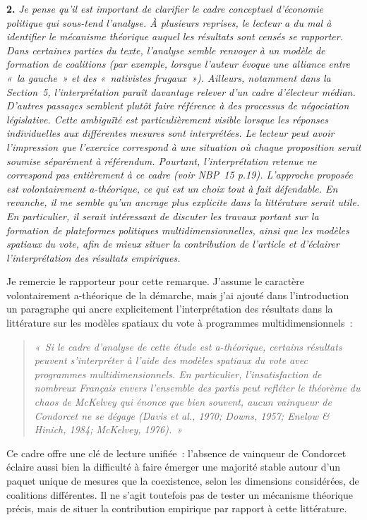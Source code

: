 \documentclass[12pt,french]{article}
\begin{document}
\bigskip
\noindent\textbf{2.} \textit{Je pense qu'il est important de clarifier le cadre conceptuel d'économie politique qui sous-tend l'analyse. À plusieurs reprises, le lecteur a du mal à identifier le mécanisme théorique auquel les résultats sont censés se rapporter. Dans certaines parties du texte, l'analyse semble renvoyer à un modèle de formation de coalitions (par exemple, lorsque l'auteur évoque une alliance entre «~la gauche~» et des «~nativistes frugaux~»). Ailleurs, notamment dans la Section~5, l'interprétation paraît davantage relever d'un cadre d'électeur médian. D'autres passages semblent plutôt faire référence à des processus de négociation législative. Cette ambiguïté est particulièrement visible lorsque les réponses individuelles aux différentes mesures sont interprétées. Le lecteur peut avoir l'impression que l'exercice correspond à une situation où chaque proposition serait soumise séparément à référendum. Pourtant, l'interprétation retenue ne correspond pas entièrement à ce cadre (voir NBP~15 p.19). L'approche proposée est volontairement a-théorique, ce qui est un choix tout à fait défendable. En revanche, il me semble qu'un ancrage plus explicite dans la littérature serait utile. En particulier, il serait intéressant de discuter les travaux portant sur la formation de plateformes politiques multidimensionnelles, ainsi que les modèles spatiaux du vote, afin de mieux situer la contribution de l'article et d'éclairer l'interprétation des résultats empiriques.}

Je remercie le rapporteur pour cette remarque. J'assume le caractère volontairement a-théorique de la démarche, mais j'ai ajouté dans l'introduction un paragraphe qui ancre explicitement l'interprétation des résultats dans la littérature sur les modèles spatiaux du vote à programmes multidimensionnels~:
\begin{quote}
\textit{«~Si le cadre d'analyse de cette étude est a-théorique, certains résultats peuvent s'interpréter à l'aide des modèles spatiaux du vote avec programmes multidimensionnels. En particulier, l'insatisfaction de nombreux Français envers l'ensemble des partis peut refléter le théorème du chaos de McKelvey qui énonce que bien souvent, aucun vainqueur de Condorcet ne se dégage  (Davis et al., 1970; Downs, 1957; Enelow \& Hinich, 1984; McKelvey, 1976).~»}
\end{quote}
Ce cadre offre une clé de lecture unifiée~: l'absence de vainqueur de Condorcet éclaire aussi bien la difficulté à faire émerger une majorité stable autour d'un paquet unique de mesures que la coexistence, selon les dimensions considérées, de coalitions différentes. Il ne s'agit toutefois pas de tester un mécanisme théorique précis, mais de situer la contribution empirique par rapport à cette littérature.
\end{document}
